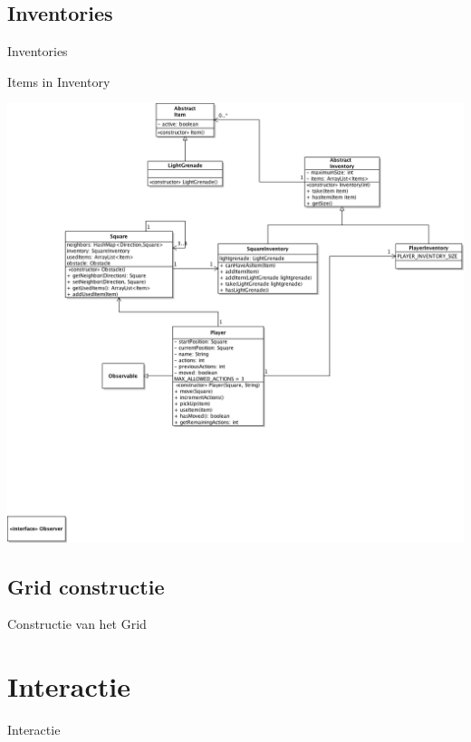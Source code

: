 \documentclass[t]{beamer}
\begin{document}
\subsection{Inventories}
\begin{frame}{Inventories}
\begin{multicols}{2}
\tableofcontents[currentsection]
\end{multicols}
\end{frame}

\begin{frame}[plain]{Items in Inventory}
\begin{center}
\includegraphics[width= 0.9\linewidth]{../uml/classdiagramInventory.png}
\end{center}
\end{frame}

\subsection{Grid constructie}
\begin{frame}{Constructie van het Grid}

\end{frame}

\section{Interactie}
\begin{frame}{Interactie}
\begin{multicols}{2}
\tableofcontents[currentsection]
\end{multicols}
\end{frame}
\end{document}
